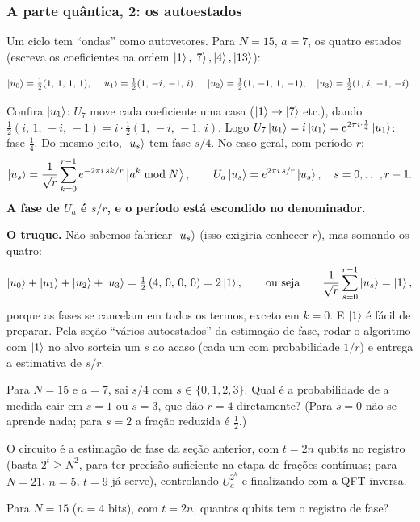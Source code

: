 \subsubsection{A parte quântica, 2: os autoestados}\label{a-parte-quuxe2ntica-2-os-autoestados}

Um ciclo tem ``ondas'' como autovetores. Para \(N=15\), \(a=7\), os quatro estados (escreva os coeficientes na ordem \(\left|{1}\right>,\left|{7}\right>,\left|{4}\right>,\left|{13}\right>\)):

\[
\left|{u_0}\right>=\tfrac12(1,\,1,\,1,\,1),\quad
\left|{u_1}\right>=\tfrac12(1,\,-i,\,-1,\,i),\quad
\left|{u_2}\right>=\tfrac12(1,\,-1,\,1,\,-1),\quad
\left|{u_3}\right>=\tfrac12(1,\,i,\,-1,\,-i).
\]

Confira \(\left|{u_1}\right>\): \(U_7\) move cada coeficiente uma casa (\(\left|{1}\right>\to\left|{7}\right>\) etc.), dando \(\tfrac12(i,\,1,\,-i,\,-1)=i\cdot\tfrac12(1,\,-i,\,-1,\,i)\). Logo \(U_7\left|{u_1}\right>=i\left|{u_1}\right>=e^{2\pi i\cdot\frac14}\left|{u_1}\right>\): fase \(\tfrac14\). Do mesmo jeito, \(\left|{u_s}\right>\) tem fase \(s/4\). No caso geral, com período \(r\):
\[
\left|{u_s}\right>=\frac1{\sqrt r}\sum_{k=0}^{r-1}e^{-2\pi i\,sk/r}\left|{a^k \bmod N}\right>,\qquad U_a\left|{u_s}\right>=e^{2\pi i\,s/r}\left|{u_s}\right>,\quad s=0,\dots,r-1.
\]
\textbf{A fase de \(U_a\) é \(s/r\), e o período está escondido no denominador.}

\textbf{O truque.} Não sabemos fabricar \(\left|{u_s}\right>\) (isso exigiria conhecer \(r\)), mas somando os quatro:
\[
\left|{u_0}\right>+\left|{u_1}\right>+\left|{u_2}\right>+\left|{u_3}\right>=\tfrac12\,(4,\,0,\,0,\,0)=2\left|{1}\right>,\qquad\text{ou seja}\qquad \frac1{\sqrt r}\sum_{s=0}^{r-1}\left|{u_s}\right>=\left|{1}\right>,
\]
porque as fases se cancelam em todos os termos, exceto em \(k=0\). E \(\left|{1}\right>\) é fácil de preparar. Pela seção ``vários autoestados'' da estimação de fase, rodar o algoritmo com \(\left|{1}\right>\) no alvo sorteia um \(s\) ao acaso (cada um com probabilidade \(1/r\)) e entrega a estimativa de \(s/r\).

Para \(N=15\) e \(a=7\), sai \(s/4\) com \(s\in\{0,1,2,3\}\). Qual é a probabilidade de a medida cair em \(s=1\) ou \(s=3\), que dão \(r=4\) diretamente? (Para \(s=0\) não se aprende nada; para \(s=2\) a fração reduzida é \(\tfrac12\).)

O circuito é a estimação de fase da seção anterior, com \(t=2n\) qubits no registro (basta \(2^t\ge N^2\), para ter precisão suficiente na etapa de frações contínuas; para \(N=21\), \(n=5\), \(t=9\) já serve), controlando \(U_a^{2^k}\) e finalizando com a QFT inversa.

Para \(N=15\) (\(n=4\) bits), com \(t=2n\), quantos qubits tem o registro de fase?

